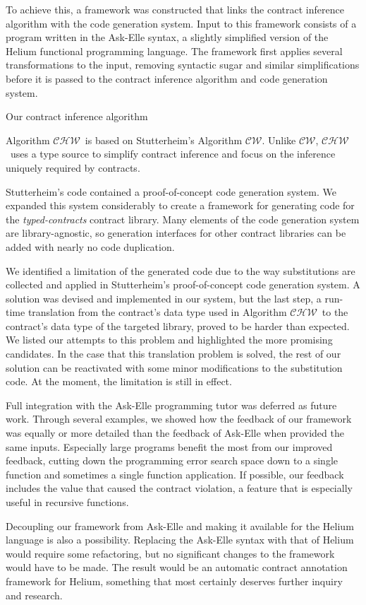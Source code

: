 \documentclass[10pt]{report}
\newcommand{\CW}{$\mathcal{CW}$}
\newcommand{\CHW}{$\mathcal{CHW}$}
\begin{document}
{To achieve this, a framework was constructed that links the contract inference algorithm with the code generation system.
Input to this framework consists of a program written in the Ask-Elle syntax, a slightly simplified version of the Helium functional programming language.
The framework first applies several transformations to the input, removing syntactic sugar and similar simplifications before it is passed to the contract inference algorithm and code generation system.

Our contract inference algorithm {Algorithm \CHW ~is based on Stutterheim's Algorithm \CW. Unlike \CW, \CHW ~uses a type source to simplify contract inference and focus on the inference uniquely required by contracts.

Stutterheim's code contained a proof-of-concept code generation system.
We expanded this system considerably to create a framework for generating code for the \textit{typed-contracts} contract library.
Many elements of the code generation system are library-agnostic, so generation interfaces for other contract libraries can be added with nearly no code duplication.

We identified a limitation of the generated code due to the way substitutions are collected and applied in Stutterheim's proof-of-concept code generation system.
A solution was devised and implemented in our system, but the last step, a run-time translation from the contract's data type used in Algorithm \CHW ~to the contract's data type of the targeted library, proved to be harder than expected.
We listed our attempts to this problem and highlighted the more promising candidates.
In the case that this translation problem is solved, the rest of our solution can be reactivated with some minor modifications to the substitution code.
At the moment, the limitation is still in effect.

Full integration with the Ask-Elle programming tutor was deferred as future work.
Through several examples, we showed how the feedback of our framework was equally or more detailed than the feedback of Ask-Elle when provided the same inputs.
Especially large programs benefit the most from our improved feedback, cutting down the programming error search space down to a single function and sometimes a single function application.
If possible, our feedback includes the value that caused the contract violation, a feature that is especially useful in recursive functions.

Decoupling our framework from Ask-Elle and making it available for the Helium language is also a possibility.
Replacing the Ask-Elle syntax with that of Helium would require some refactoring, but no significant changes to the framework would have to be made.
The result would be an automatic contract annotation framework for Helium, something that most certainly deserves further inquiry and research.

}}
\end{document}
